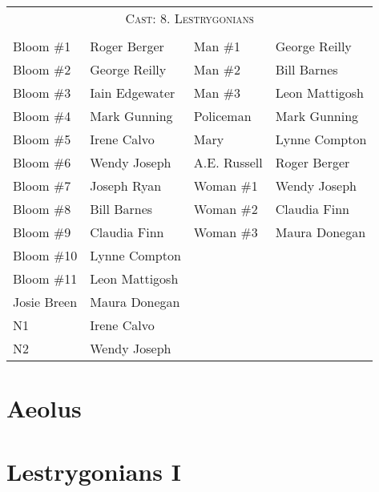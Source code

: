 \bigskip
\bigskip

\begin{tabular}{l p{5cm} l p{5cm}}
    \multicolumn{4}{c}{\Large \textsc{Cast: 8. Lestrygonians}} \\
\\
Bloom \#1           & Roger Berger      & Man \#1               & George Reilly \\
Bloom \#2           & George Reilly     & Man \#2               & Bill Barnes \\
Bloom \#3           & Iain Edgewater    & Man \#3               & Leon Mattigosh \\
Bloom \#4           & Mark Gunning      & Policeman             & Mark Gunning \\
Bloom \#5           & Irene Calvo       & Mary                  & Lynne Compton \\
Bloom \#6           & Wendy Joseph      & A.E. Russell          & Roger Berger \\
Bloom \#7           & Joseph Ryan       & Woman \#1             & Wendy Joseph \\
Bloom \#8           & Bill Barnes       & Woman \#2             & Claudia Finn \\
Bloom \#9           & Claudia Finn      & Woman \#3             & Maura Donegan \\
Bloom \#10          & Lynne Compton     &                       & \\
Bloom \#11          & Leon Mattigosh    &                       & \\
Josie Breen         & Maura Donegan     &                       & \\
N1                  & Irene Calvo       &                       & \\
N2                  & Wendy Joseph      &                       & \\

\end{tabular}
\thispagestyle{empty}

\newpage


\setcounter{page}{1}
\setcounter{section}{6}  %

\section{Aeolus}


\pagebreak

\section{Lestrygonians I}



